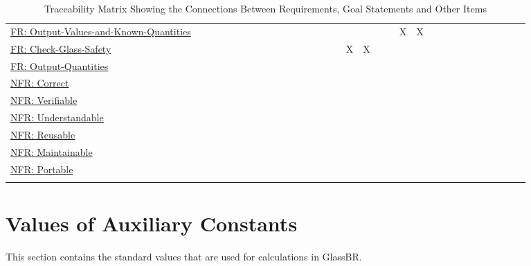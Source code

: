 \documentclass[12pt]{article}
\begin{document}
\begin{longtable}{l l l l l l l l l l l l l l l l l l l l l l l l l l l l l l l l}
\\
\hyperref[outputValsAndKnownQuants]{FR: Output-Values-and-Known-Quantities} &  &  &  &  &  &  &  &  &  &  &  &  &  &  &  &  &  &  &  & X & X &  &  &  &  &  &  &  &  &  & 
\\
\hyperref[checkGlassSafety]{FR: Check-Glass-Safety} &  &  &  &  &  &  &  &  &  &  &  &  &  &  &  & X & X &  &  &  &  &  &  &  &  &  &  &  &  &  & 
\\
\hyperref[outputQuants]{FR: Output-Quantities} &  &  &  &  &  &  &  &  &  &  &  &  &  &  &  &  &  &  &  &  &  &  &  &  &  &  &  &  &  &  & 
\\
\hyperref[correct]{NFR: Correct} &  &  &  &  &  &  &  &  &  &  &  &  &  &  &  &  &  &  &  &  &  &  &  &  &  &  &  &  &  &  & 
\\
\hyperref[verifiable]{NFR: Verifiable} &  &  &  &  &  &  &  &  &  &  &  &  &  &  &  &  &  &  &  &  &  &  &  &  &  &  &  &  &  &  & 
\\
\hyperref[understandable]{NFR: Understandable} &  &  &  &  &  &  &  &  &  &  &  &  &  &  &  &  &  &  &  &  &  &  &  &  &  &  &  &  &  &  & 
\\
\hyperref[reusable]{NFR: Reusable} &  &  &  &  &  &  &  &  &  &  &  &  &  &  &  &  &  &  &  &  &  &  &  &  &  &  &  &  &  &  & 
\\
\hyperref[maintainable]{NFR: Maintainable} &  &  &  &  &  &  &  &  &  &  &  &  &  &  &  &  &  &  &  &  &  &  &  &  &  &  &  &  &  &  & 
\\
\hyperref[portable]{NFR: Portable} &  &  &  &  &  &  &  &  &  &  &  &  &  &  &  &  &  &  &  &  &  &  &  &  &  &  &  &  &  &  & 
\\
\bottomrule
\caption{Traceability Matrix Showing the Connections Between Requirements, Goal Statements and Other Items}
\label{Table:TraceMatAllvsR}
\end{longtable}
\section{Values of Auxiliary Constants}
\label{Sec:AuxConstants}
This section contains the standard values that are used for calculations in GlassBR.
\end{document}
